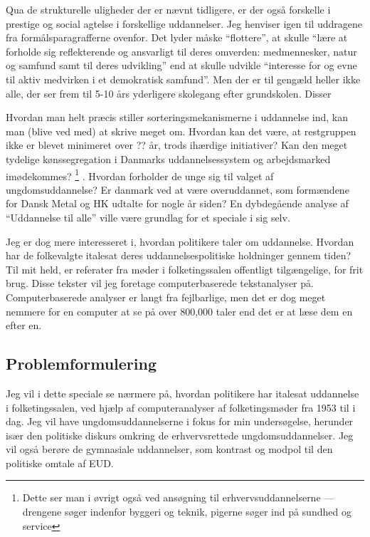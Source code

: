 Qua de strukturelle uligheder der er nævnt tidligere, er der også forskelle i prestige og social agtelse i forskellige uddannelser.
Jeg henviser igen til uddragene fra formålsparagrafferne ovenfor.
Det lyder måske “flottere”, at skulle “lære at forholde sig reflekterende og ansvarligt til deres omverden: medmennesker, natur og samfund samt til deres udvikling” end at skulle udvikle “interesse for og evne til aktiv medvirken i et demokratisk samfund”.
Men der er til gengæld heller ikke alle, der ser frem til 5-10 års yderligere skolegang efter grundskolen.
Disser 


Hvordan man helt præcis stiller sorteringsmekanismerne i uddannelse ind, kan man (blive ved med) at skrive meget om.
Hvordan kan det være, at restgruppen ikke er blevet minimeret over ?? år, trods ihærdige initiativer?
Kan den meget tydelige kønssegregation i Danmarks uddannelsessystem og arbejdsmarked imødekommes?
\footnote{Dette ser man i øvrigt også ved ansøgning til erhvervsuddannelserne — drengene søger indenfor byggeri og teknik, pigerne søger ind på sundhed og service} .
Hvordan forholder de unge sig til valget af ungdomsuddannelse?
Er danmark ved at være overuddannet, som formændene for Dansk Metal og HK udtalte for nogle år siden? \autocite{simonsenLadOsGore2016}
En dybdegående analyse af “Uddannelse til alle” ville være grundlag for et speciale i sig selv.

Jeg er dog mere interesseret i, hvordan politikere taler om uddannelse.
Hvordan har de folkevalgte italesat deres uddannelsespolitiske holdninger gennem tiden?
Til mit held, er referater fra møder i folketingssalen offentligt tilgængelige, for frit brug.
Disse tekster vil jeg foretage computerbaserede tekstanalyser på.
Computerbaserede analyser er langt fra fejlbarlige, men det er dog meget nemmere for en computer at se på over 800,000 taler end det er at læse dem en efter en.

\subsection{Problemformulering}\label{sec:pf}
Jeg vil i dette speciale se nærmere på, hvordan politikere har italesat uddannelse i folketingssalen, ved hjælp af computeranalyser af folketingsmøder fra 1953 til i dag.
Jeg vil have ungdomsuddannelserne i fokus for min undersøgelse, herunder især den politiske diskurs omkring de erhvervsrettede ungdomsuddannelser.
Jeg vil også berøre de gymnasiale uddannelser, som kontrast og modpol til den politiske omtale af EUD.

